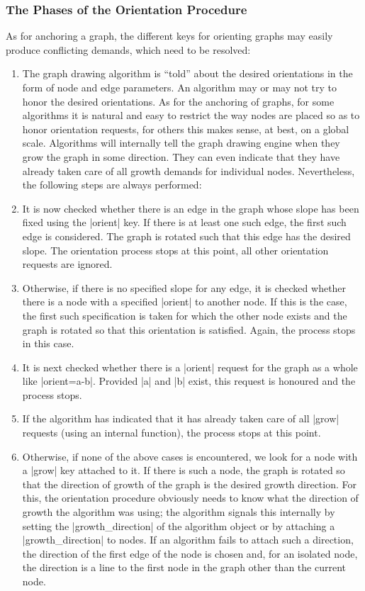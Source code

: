 \subsubsection{The Phases of the Orientation Procedure}
\label{subsection-graph-orientation-phases}

As for anchoring a graph, the different keys for orienting graphs may
easily produce conflicting demands, which need to be
resolved:

\begin{enumerate}
\item
  The graph drawing algorithm is ``told'' about the desired
  orientations in the form of node and edge parameters. 
  An algorithm may or may not try to honor the desired
  orientations. As for the anchoring of graphs, for some algorithms it
  is natural and easy to restrict the way nodes are placed so as to
  honor orientation requests, for others this makes sense, at best, on
  a global scale. Algorithms will internally tell the graph drawing
  engine when they grow the graph in some direction. They can even
  indicate that they have already taken care of all growth demands for
  individual nodes. Nevertheless, the following steps are always
  performed:
\item
  It is now checked whether there is an edge in the graph whose
  slope has been fixed using the |orient| key. If there is at least one
  such edge, the first such edge is considered. The graph is rotated
  such that this edge has the desired slope. The orientation process
  stops at this point, all other orientation requests are ignored.
\item
  Otherwise, if there is no specified slope for any edge, it is
  checked whether there is a node with a specified |orient| to another
  node. If this is the case, the first such specification is taken for
  which the other node exists and the graph is rotated so that this
  orientation is satisfied. Again, the process stops in this case.
\item
  It is next checked whether there is a |orient| request for the graph
  as a whole like |orient=a-b|. Provided |a| and |b| exist, this
  request is honoured and the process stops.
\item
  If the algorithm has indicated that it has already taken care of all
  |grow| requests (using an internal function), the process stops at
  this point.
\item
  Otherwise, if none of the above cases is encountered, we look for
  a node with a |grow| key attached to it. If there is such a node,
  the graph is rotated so that the direction of growth of the graph is
  the desired growth direction. For this, the orientation procedure
  obviously needs to know what the direction of growth the algorithm
  was using; the algorithm signals this internally by setting the
  |growth_direction| of the algorithm object or by attaching a
  |growth_direction| to nodes. If an algorithm fails to attach such a
  direction, the direction of the first edge of the node is chosen
  and, for an isolated node, the direction is a line to the first node
  in the graph other than the current node.
  

\end{enumerate}
